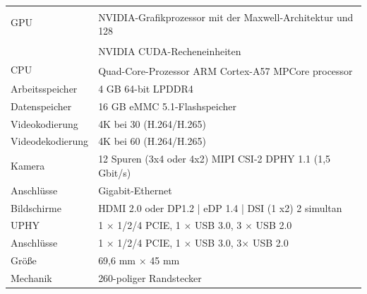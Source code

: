 \begin{tabular}{ll}
	GPU  &  NVIDIA-Grafikprozessor mit der Maxwell\textsuperscript{\texttrademark}-Architektur und 128 \\
	&   NVIDIA CUDA\textsuperscript{\textregistered}-Recheneinheiten \\
	CPU  &  Quad-Core-Prozessor ARM\textsuperscript{\textregistered} Cortex\textsuperscript{\textregistered}-A57 MPCore processor \\
	Arbeitsspeicher &   4 GB 64-bit LPDDR4 \\
	Datenspeicher  &  16 GB eMMC 5.1-Flashspeicher \\
	Videokodierung  &  4K bei 30 (H.264/H.265) \\
	Videodekodierung &   4K bei 60 (H.264/H.265) \\
	Kamera  &  12 Spuren (3x4 oder 4x2) MIPI CSI-2 DPHY 1.1 (1,5 Gbit/s) \\
	Anschlüsse  &  Gigabit-Ethernet \\
	Bildschirme  &  HDMI 2.0 oder DP1.2 | eDP 1.4 | DSI (1 x2) 2 simultan \\
	UPHY  &  1 $\times$ 1/2/4 PCIE, 1 $\times$ USB 3.0, 3 $\times$ USB 2.0 \\
	Anschlüsse &   1 $\times$ 1/2/4 PCIE, 1 $\times$ USB 3.0, 3$\times$ USB 2.0 \\
	Größe  &  69,6 mm $\times$ 45 mm \\
	Mechanik  &  260-poliger Randstecker  \\
\end{tabular}


